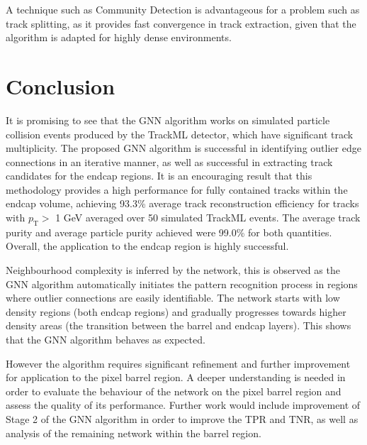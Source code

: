 A technique such as Community Detection is advantageous for a problem such as track splitting, as it provides fast convergence in track extraction, given that the algorithm is adapted for highly dense environments.






\section{Conclusion}

It is promising to see that the GNN algorithm works on simulated particle collision events produced by the TrackML detector, which have significant track multiplicity. The proposed GNN algorithm is successful in identifying outlier edge connections in an iterative manner, as well as successful in extracting track candidates for the endcap regions. It is an encouraging result that this methodology provides a high performance for fully contained tracks within the endcap volume, achieving 93.3\% average track reconstruction efficiency for tracks with $p_{\text{T}} >$ 1 GeV averaged over 50 simulated TrackML events. The average track purity and average particle purity achieved were 99.0\% for both quantities. Overall, the application to the endcap region is highly successful.

Neighbourhood complexity is inferred by the network, this is observed as the GNN algorithm automatically initiates the pattern recognition process in regions where outlier connections are easily identifiable. The network starts with low density regions (both endcap regions) and gradually progresses towards higher density areas (the transition between the barrel and endcap layers). This shows that the GNN algorithm behaves as expected.

However the algorithm requires significant refinement and further improvement for application to the pixel barrel region. A deeper understanding is needed in order to evaluate the behaviour of the network on the pixel barrel region and assess the quality of its performance. Further work would include improvement of Stage 2 of the GNN algorithm in order to improve the TPR and TNR, as well as analysis of the remaining network within the barrel region.
